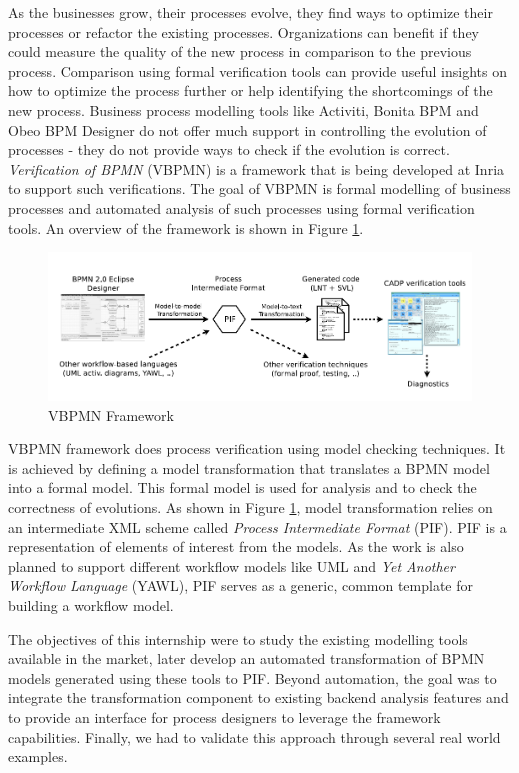 \documentclass{article}
\begin{document}
As the businesses grow, their processes evolve, they find ways to optimize their processes or refactor the existing processes. Organizations can benefit if they could measure the quality of the new process in comparison to the previous process. Comparison using formal verification tools can provide useful insights on how to optimize the process further or help identifying the shortcomings of the new process. Business process modelling tools like Activiti, Bonita BPM and Obeo BPM Designer do not offer much support in controlling the evolution of processes - they do not provide ways to check if the evolution is correct. \textit{Verification of BPMN} (VBPMN) \cite{Salaun:Malaga} is a framework that is being developed at Inria to support such verifications. The goal of VBPMN is formal modelling of business processes and automated analysis of such processes using formal verification tools. An overview of the framework is shown in Figure \ref{fig:vbpmn}.

\begin{figure}[ht]
\center
\includegraphics[width=1.0\linewidth]{Fig1.png}
\caption{VBPMN Framework}
\label{fig:vbpmn}
\end{figure}
VBPMN framework does process verification using model checking techniques. It is achieved by defining a model transformation that translates a BPMN model into a formal model. This formal model is used for analysis and to check the correctness of evolutions. As shown in Figure \ref{fig:vbpmn}, model transformation relies on an intermediate XML scheme called \textit{Process Intermediate Format} (PIF). PIF is a representation of elements of interest from the models. As the work is also planned to support different workflow models like UML and \textit{Yet Another Workflow Language} (YAWL), PIF serves as a generic, common template for building a workflow model. 

The objectives of this internship were to study the existing modelling tools available in the market, later develop an automated transformation of BPMN models generated using these tools to PIF. Beyond automation, the goal was to integrate the transformation component to existing backend analysis features and to provide an interface for process designers to leverage the framework capabilities. Finally, we had to validate this approach through several real world examples. 
\end{document}
